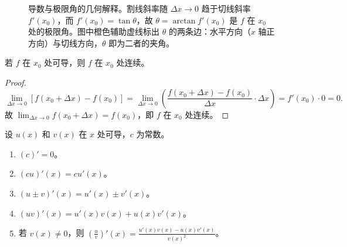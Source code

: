 \begin{figure}[htbp]
\caption{导数与极限角的几何解释。割线斜率随 $\Delta x \to 0$ 趋于切线斜率 $f'(x_0)$，而 $f'(x_0)=\tan\theta$，故 $\theta=\arctan f'(x_0)$ 是 $f$ 在 $x_0$ 处的极限角。图中橙色辅助虚线标出 $\theta$ 的两条边：水平方向（$x$ 轴正方向）与切线方向，$\theta$ 即为二者的夹角。}
\label{fig:derivative_limit_angle}
\end{figure}

\begin{proposition}[可导必连续]\label{prop:diff_implies_cont}
若 $f$ 在 $x_0$ 处可导，则 $f$ 在 $x_0$ 处连续。
\end{proposition}

\begin{proof}
\[
\lim_{\Delta x \to 0} [f(x_0+\Delta x) - f(x_0)] = \lim_{\Delta x \to 0} \left( \frac{f(x_0+\Delta x) - f(x_0)}{\Delta x} \cdot \Delta x \right) = f'(x_0) \cdot 0 = 0.
\]
故 $\lim_{\Delta x \to 0} f(x_0+\Delta x) = f(x_0)$，即 $f$ 在 $x_0$ 处连续。
\end{proof}

\begin{theorem}[求导法则]\label{thm:derivative_rules}
设 $u(x)$ 和 $v(x)$ 在 $x$ 处可导，$c$ 为常数。
\begin{enumerate}[label=(\roman*)]
    \item $(c)' = 0$。
    \item $(cu)'(x) = c u'(x)$。
    \item $(u \pm v)'(x) = u'(x) \pm v'(x)$。
    \item $(uv)'(x) = u'(x)v(x) + u(x)v'(x)$。
    \item 若 $v(x) \neq 0$，则 $\left(\frac{u}{v}\right)'(x) = \frac{u'(x)v(x) - u(x)v'(x)}{v(x)^2}$。
\end{enumerate}
\end{theorem}

